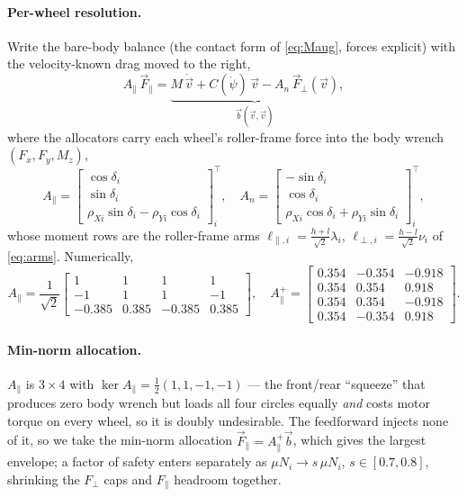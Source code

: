 \documentclass[11pt]{article}
\begin{document}
\paragraph{Per-wheel resolution.} Write the bare-body balance (the contact form of \eqref{eq:Maug},
forces explicit) with the velocity-known drag moved to the right,
\begin{equation}
A_\parallel\,\vec F_\parallel=\underbrace{M\,\dot{\vec v}+C(\dot\psi)\,\vec v-A_n\,\vec F_\perp(\vec v)}_{\textstyle\vec b(\vec v,\dot{\vec v})},
\label{eq:alloc}
\end{equation}
where the allocators carry each wheel's roller-frame force into the body wrench $(F_x,F_y,M_z)$,
\begin{equation}
A_\parallel=\begin{bmatrix}\cos\delta_i\\[1pt]\sin\delta_i\\[1pt]\rho_{Xi}\sin\delta_i-\rho_{Yi}\cos\delta_i\end{bmatrix}^{\!\top}_{\!\!i},\quad
A_n=\begin{bmatrix}-\sin\delta_i\\[1pt]\cos\delta_i\\[1pt]\rho_{Xi}\cos\delta_i+\rho_{Yi}\sin\delta_i\end{bmatrix}^{\!\top}_{\!\!i},
\end{equation}
whose moment rows are the roller-frame arms $\ell_{\parallel,i}=\tfrac{h+l}{\sqrt2}\lambda_i$,
$\ell_{\perp,i}=\tfrac{h-l}{\sqrt2}\nu_i$ of \eqref{eq:arms}. Numerically,
\begin{equation}
A_\parallel=\frac{1}{\sqrt2}\!\begin{bmatrix}1&1&1&1\\-1&1&1&-1\\-0.385&0.385&-0.385&0.385\end{bmatrix},\quad
A_\parallel^{+}=\begin{bmatrix}0.354&-0.354&-0.918\\0.354&0.354&0.918\\0.354&0.354&-0.918\\0.354&-0.354&0.918\end{bmatrix}.
\end{equation}

\paragraph{Min-norm allocation.} $A_\parallel$ is $3\times4$ with
$\ker A_\parallel=\tfrac12(1,1,-1,-1)$ --- the front/rear ``squeeze'' that produces zero body
wrench but loads all four circles equally \emph{and} costs motor torque on every wheel, so it is
doubly undesirable. The feedforward injects none of it, so we take the
min-norm allocation $\vec F_\parallel=A_\parallel^{+}\vec b$, which gives the largest envelope; a
factor of safety enters separately as $\mu N_i\to s\,\mu N_i$, $s\in[0.7,0.8]$, shrinking the
$F_\perp$ caps and $F_\parallel$ headroom together.
\end{document}
